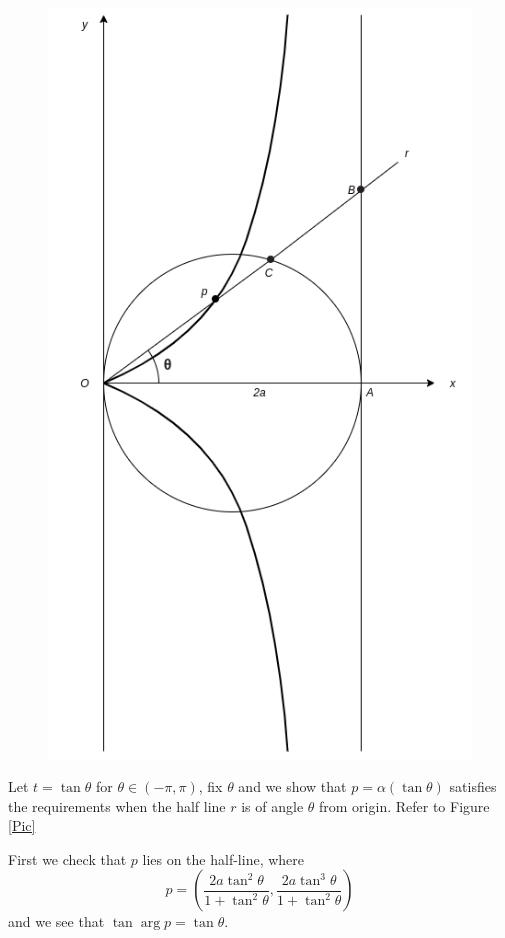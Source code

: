 \documentclass[12pt]{article}
\begin{document}
\begin{figure}
     \center
     \includegraphics[scale = 0.3]{Untitled Diagram.png}
\end{figure}

Let \(t = \tan\theta\) for \(\theta \in (-\pi,\pi)\), fix \(\theta\) and
we show that \(p = \alpha(\tan\theta)\) satisfies the requirements when
the half line \(r\) is of angle \(\theta\) from origin. Refer to Figure \ref{Pic}

First we check that \(p\) lies on the half-line, where
\[ p = \left( \frac{2a\tan^2\theta}{1+\tan^2\theta}, \frac{2a\tan^3\theta}{1+\tan^2\theta} \right) \]
and we see that \(\tan\arg p = \tan\theta\).
\end{document}
